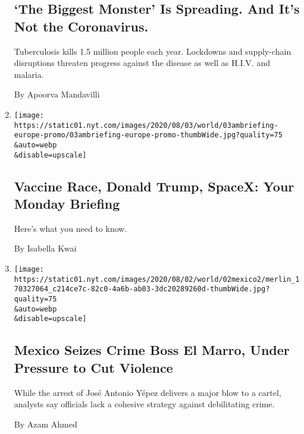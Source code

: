 \begin{enumerate}
  \hypertarget{the-biggest-monster-is-spreading-and-its-not-the-coronavirus}{%
  \subsection{`The Biggest Monster' Is Spreading. And It's Not the
  Coronavirus.}\label{the-biggest-monster-is-spreading-and-its-not-the-coronavirus}}

  Tuberculosis kills 1.5 million people each year. Lockdowns and
  supply-chain disruptions threaten progress against the disease as well
  as H.I.V. and malaria.

  By Apoorva Mandavilli
\item
  \href{/2020/08/02/briefing/vaccine-race-donald-trump-spacex.html}{}

  \texttt{[image: https://static01.nyt.com/images/2020/08/03/world/03ambriefing-europe-promo/03ambriefing-europe-promo-thumbWide.jpg?quality=75\\\&auto=webp\\\&disable=upscale]}

  \hypertarget{vaccine-race-donald-trump-spacex-your-monday-briefing}{%
  \subsection{Vaccine Race, Donald Trump, SpaceX: Your Monday
  Briefing}\label{vaccine-race-donald-trump-spacex-your-monday-briefing}}

  Here's what you need to know.

  By Isabella Kwai
\item
  \href{/2020/08/02/world/americas/mexico-el-marro-capture.html}{}

  \texttt{[image: https://static01.nyt.com/images/2020/08/02/world/02mexico2/merlin\_170327064\_c214ce7c-82c0-4a6b-ab03-3dc20289260d-thumbWide.jpg?quality=75\\\&auto=webp\\\&disable=upscale]}

  \hypertarget{mexico-seizes-crime-boss-el-marro-under-pressure-to-cut-violence}{%
  \subsection{Mexico Seizes Crime Boss El Marro, Under Pressure to Cut
  Violence}\label{mexico-seizes-crime-boss-el-marro-under-pressure-to-cut-violence}}

  While the arrest of José Antonio Yépez delivers a major blow to a
  cartel, analysts say officials lack a cohesive strategy against
  debilitating crime.

  By Azam Ahmed
\end{enumerate}

